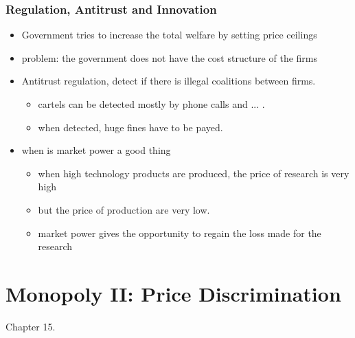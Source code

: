 \documentclass[12pt, a4paper, titlepage]{extarticle}
\begin{document}
	\subsubsection{Regulation, Antitrust and Innovation}
	\begin{itemize}
	\item Government tries to increase the total welfare by setting price ceilings
	\item problem: the government does not have the cost structure of the firms
	\item Antitrust regulation, detect if there is illegal coalitions between firms. 
	\begin{itemize}
	\item cartels can be detected mostly by phone calls and ... .
	\item when detected, huge fines have to be payed.
	\end{itemize}
	\item when is market power a good thing
	\begin{itemize}
	\item when high technology products are produced, the price of research is very high
	\item but the price of production are very low. 
	\item market power gives the opportunity to regain the loss made for the research
	\end{itemize}
	
	\end{itemize}
	
	\section{Monopoly II: Price Discrimination}
	Chapter 15.
	
\end{document}
